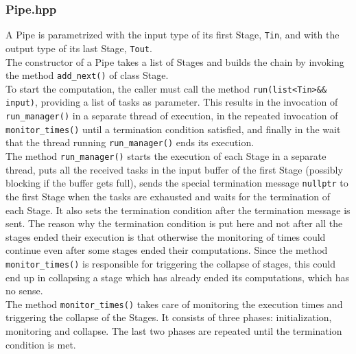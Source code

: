 \documentclass[12pt]{article}
\begin{document}
\subsubsection{Pipe.hpp}
A Pipe is parametrized with the input type of its first Stage, \texttt{Tin}, and with the output type of its last Stage, \texttt{Tout}. \\
The constructor of a Pipe takes a list of Stages and builds the chain by invoking the method \texttt{add\_next()} of class Stage. \\
To start the computation, the caller must call the method \texttt{run(list<Tin>\&\& input)}, providing a list of tasks as parameter. This results in the invocation of \texttt{run\_manager()} in a separate thread of execution, in the repeated invocation of \texttt{monitor\_times()} until a termination condition satisfied, and finally in the wait that the thread running \texttt{run\_manager()} ends its execution. \\
The method \texttt{run\_manager()} starts the execution of each Stage in a separate thread, puts all the received tasks in the input buffer of the first Stage (possibly blocking if the buffer gets full), sends the special termination message \texttt{nullptr} to the first Stage when the tasks are exhausted and waits for the termination of each Stage. It also sets the termination condition after the termination message is sent. The reason why the termination condition is put here and not after all the stages ended their execution is that otherwise the monitoring of times could continue even after some stages ended their computations. Since the method \texttt{monitor\_times()} is responsible for triggering the collapse of stages, this could end up in collapsing a stage which has already ended its computations, which has no sense. \\
The method \texttt{monitor\_times()} takes care of monitoring the execution times and triggering the collapse of the Stages. It consists of three phases: initialization, monitoring and collapse. The last two phases are repeated until the termination condition is met.
\end{document}
